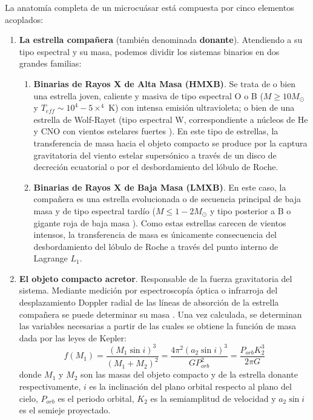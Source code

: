 La anatomía completa de un microcuásar está compuesta por cinco elementos acoplados:
\begin{enumerate}
    \item \textbf{La estrella compañera} (también denominada \textbf{donante}). Atendiendo a su tipo espectral y su masa, podemos dividir los sistemas binarios en dos grandes familias:
    \begin{enumerate}
        \item \textbf{Binarias de Rayos X de Alta Masa (HMXB)}. Se trata de o bien una estrella joven, caliente y masiva de tipo espectral O o B ($M\geq 10 M_\odot$ y $T_{eff}\sim 10^4-5\times^4$ K) con intensa emisión ultravioleta; o bien de una estrella de Wolf-Rayet (tipo espectral W, correspondiente a núcleos de He y CNO con vientos estelares fuertes \cite{mornas2026bloque2}). 
        En este tipo de estrellas, la transferencia de masa hacia el objeto compacto se produce por la captura gravitatoria del viento estelar supersónico a través de un disco de decreción ecuatorial o por el desbordamiento del lóbulo de Roche.
        \item \textbf{Binarias de Rayos X de Baja Masa (LMXB)}. En este caso, la compañera es una estrella evolucionada o de secuencia principal de baja masa y de tipo espectral tardío ($M\leq 1-2 M_\odot$ y tipo posterior a B o gigante roja de baja masa \cite{fender_gallo,malzac}). 
        Como estas estrellas carecen de vientos intensos, la transferencia de masa es únicamente consecuencia del desbordamiento del lóbulo de Roche a través del punto interno de Lagrange $L_1$.
    \end{enumerate}
    \item \textbf{El objeto compacto acretor}. Responsable de la fuerza gravitatoria del sistema. Mediante medición por espectroscopía óptica o infrarroja del desplazamiento Doppler radial de las líneas de absorción de la estrella compañera se puede determinar su masa \cite{mornas2026bloque1}. Una vez calculada, se determinan las variables necesarias a partir de las cuales se obtiene la función de masa \cite{mornas2026bloque1} dada por las leyes de Kepler:
    \begin{equation}
        f(M_1)=\frac{(M_1\sin{i})^3}{(M_1+M_2)^2}=\frac{4\pi^2(a_2\sin{i})^3}{GP_{orb}^2}=\frac{P_{orb}K_2^3}{2\pi G}
    \end{equation}
    donde $M_1$ y $M_2$ son las masas del objeto compacto y de la estrella donante respectivamente, $i$ es la inclinación del plano orbital respecto al plano del cielo, $P_{orb}$ es el periodo orbital, $K_2$ es la semiamplitud de velocidad y $a_2\sin{i}$ es el semieje proyectado. 
    

\end{enumerate}
